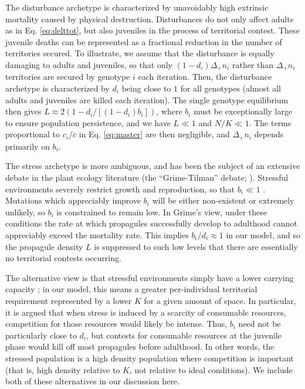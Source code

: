 \documentclass[11pt]{article}
\begin{document}
The disturbance archetype is characterized by unavoidably high extrinsic mortality caused by physical destruction. Disturbances do not only affect adults as in Eq. \eqref{eq:delttot}, but also juveniles in the process of territorial contest. These juvenile deaths can be represented as a fractional reduction in the number of territories secured. To illustrate, we assume that the disturbance is equally damaging to adults and juveniles, so that only $(1-d_i)\Delta_+ n_i$ rather than $\Delta_+ n_i$ territories are secured by genotype $i$ each iteration. Then, the disturbance archetype is characterized by $d_i$ being close to $1$ for all genotypes (almost all adults and juveniles are killed each iteration). The single genotype equilibrium then gives $L\approx 2(1-d_i/[(1-d_i)b_i])$, where $b_i$ must be exceptionally large to ensure population persistence, and we have $L\ll 1$ and $N/K\ll 1$. The terms proportional to $c_i/\overline{c}$ in Eq. \eqref{eq:master} are then negligible, and $\Delta_+ n_i$ depends primarily on $b_i$. 

The stress archetype is more ambiguous, and has been the subject of an extensive debate in the plant ecology literature (the ``Grime-Tilman'' debate; \citealt{aerts_1999}). Stressful environments severely restrict growth and reproduction, so that $b_i\ll 1$ \cite{grime_1974,grime_1977}. Mutations which appreciably improve $b_i$ will be either non-existent or extremely unlikely, so $b_i$ is constrained to remain low. In Grime's view, under these conditions the rate at which propagules successfully develop to adulthood cannot appreciably exceed the mortality rate. This implies $b_i/d_i\approx 1$ in our model, and so the propagule density $L$ is suppressed to such low levels that there are essentially no territorial contests occurring. 

The alternative view is that stressful environments simply have a lower carrying capacity \citep{taylor_1990}; in our model, this means a greater per-individual territorial requirement represented by a lower $K$ for a given amount of space. In particular, it is argued that when stress is induced by a scarcity of consumable resources, competition for those resources would likely be intense. Thus, $b_i$ need not be particularly close to $d_i$, but contests for consumable resources at the juvenile phase would kill off most propagules before adulthood. In other words, the stressed population is a high density population where competition is important \citep{taylor_1990} (that is, high density relative to $K$, not relative to ideal conditions). We include both of these alternatives in our discussion here. 
\end{document}
